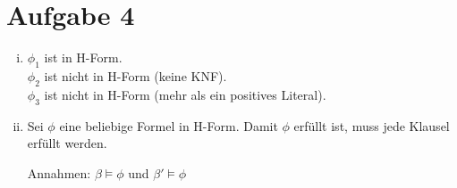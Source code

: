\documentclass[a4paper,10pt]{article}
\begin{document}
\section*{Aufgabe 4}
\begin{enumerate}[(i)]
\item
$\phi_1$ ist in H-Form.\\
$\phi_2$ ist nicht in H-Form (keine KNF).\\
$\phi_3$ ist nicht in H-Form (mehr als ein positives Literal).\\
\item

Sei $\phi$ eine beliebige Formel in H-Form. Damit $\phi$ erfüllt ist, muss jede Klausel erfüllt werden. 

Annahmen: $\beta \models \phi$ und $\beta' \models \phi$


\end{enumerate}
\end{document}
